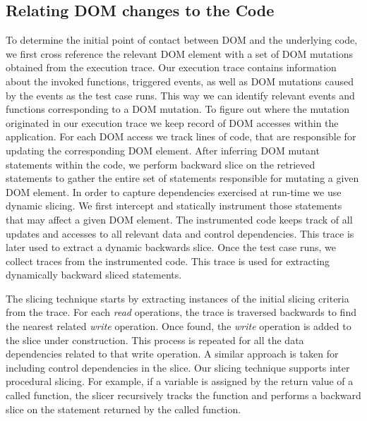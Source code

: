 \subsection{Relating DOM changes to the \javascript Code} \label{Sec:domToCode}
To determine the initial point of contact between DOM and the underlying \javascript code, we first cross reference the relevant DOM element with a set of DOM mutations obtained from the execution trace. Our execution trace contains information about the invoked functions, triggered events, as well as DOM mutations caused by the events as the test case runs. This way we can identify relevant events and functions corresponding to a DOM mutation. To figure out where the mutation originated in our execution trace we keep record of DOM accesses within the application. For each DOM access we track \javascript lines of code, that are responsible for updating the corresponding DOM element. After inferring DOM mutant statements within the code, we perform backward slice on the retrieved statements to gather the entire set of \javascript statements responsible for mutating a given DOM element. 
In order to capture dependencies exercised at run-time we use dynamic slicing. We first intercept and statically instrument those statements that may affect a given DOM element. The instrumented code keeps track of all updates and accesses to all relevant data and control dependencies. This trace is later used to extract a dynamic backwards slice.    
Once the test case runs, we collect traces from the instrumented code. This trace is used for extracting dynamically backward sliced statements.

The slicing technique starts by extracting instances of the initial slicing criteria from the trace. For each \textit{read} operations, the trace is traversed backwards to find the nearest related \textit{write} operation. Once found, the \textit{write} operation is added to the slice under construction. This process is repeated for all the data dependencies related to that write operation. A similar approach is taken for including control dependencies in the slice.
Our slicing technique supports inter procedural slicing. For example, if a variable is assigned by the return value of a called function, the slicer recursively tracks the function and performs a backward slice on the statement returned by the called function. 

